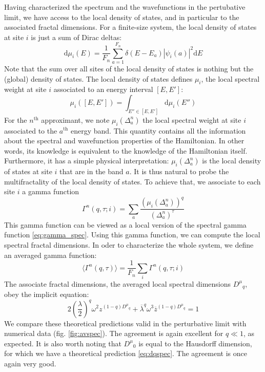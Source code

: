 \documentclass[aps,prl,preprint]{revtex4-1}
\renewcommand{\d}[1]{\mathrm{d}#1}
\newcommand{\lb}{\ensuremath{\overline{\lambda}}}
\newcommand{\zb}{\ensuremath{\overline{z}}}
\newcommand{\avspec}{\ensuremath{D^\mu}}
\begin{document}
Having characterized the spectrum and the wavefunctions in the pertubative limit, we have access to the local density of states, and in particular to the associated fractal dimensions.
For a finite-size system, the local density of states at site $i$ is just a sum of Dirac deltas:
\begin{equation}
	\d{\mu_{i}}(E) = \frac{1}{F_n} \sum_{a=1}^{F_n} \delta(E-E_a) |\psi_{i}(a)|^2 \d{E}
\end{equation}
Note that the sum over all sites of the local density of states is nothing but the (global) density of states.
The local density of states defines $\mu_i$, the local spectral weight at site $i$ associated to an energy interval $[E,E']$:
\begin{equation}
	\mu_i\left( [E,E'] \right)  = \int_{E'' \in [E,E']} \d{\mu_i}(E'')
\end{equation}
For the $n^\text{th}$ approximant, we note $\mu_i(\Delta^n_a)$ the local spectral weight at site $i$ associated to the $a^\text{th}$ energy band. 
This quantity contains all the information about the spectral and wavefunction properties of the Hamiltonian. In other words, its knowledge is equivalent to the knowledge of the Hamiltonian itself. Furthermore, it has a simple physical interpretation: $\mu_i(\Delta^n_a)$ is the local density of states at site $i$ that are in the band $a$.
It is thus natural to probe the multifractality of the local density of states. To achieve that, we associate to each site $i$ a gamma function
\begin{equation}
	\Gamma^n(q,\tau;i) = \sum_{a} \frac{\left( \mu_i(\Delta^n_a) \right)^q}{(\Delta_a^n)^\tau}
\end{equation}
This gamma function can be viewed as a local version of the spectral gamma function \eqref{eq:gamma_spec}.
Using this gamma function, we can compute the local spectral fractal dimensions. In oder to characterize the whole system, we define an averaged gamma function:
\begin{equation}
	\langle \Gamma^n(q,\tau) \rangle = \frac{1}{F_n} \sum_{i} \Gamma^n(q,\tau;i)
\end{equation}
The associate fractal dimensions, the averaged local spectral dimensions $\avspec_q$, obey the implicit equation:
\begin{equation}
	\label{eq:avspec}
	2\left( \frac{\lambda}{2}\right)^q \omega^2 z^{(1-q)\avspec_q} + \lb^q \omega^3 \zb^{(1-q)\avspec_q} = 1
\end{equation}
We compare these theoretical predictions valid in the perturbative limit with numerical data (fig. \eqref{fig:avspec}). The agreement is again excellent for $q \ll 1$, as expected. It is also worth noting that $\avspec_0$ is equal to the Hausdorff dimension, for which we have a theoretical prediction \eqref{eq:dqspec}. The agreement is once again very good.
\end{document}
